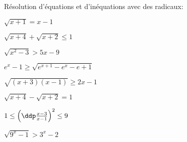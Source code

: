 
\begin{exercice}  \;
R\'esolution d'\'equations et d'in\'equations avec des radicaux:
\begin{enumerate}
\begin{minipage}[t]{0.45\textwidth}
\item $\sqrt{x+1}=x-1$
\item $\sqrt{x+4}+\sqrt{x+2}\leq 1$
\item $\sqrt{x^2-3}>5x-9$
\item $e^x-1\geq \sqrt{e^{x+1}-e^x-e+1}$
\item $\sqrt{(x+3)(x-1)}\geq 2x-1$
\end{minipage}
\begin{minipage}[t]{0.45\textwidth}
\item $\sqrt{x+4}-\sqrt{x+2}=1$
\item $1\leq \left(\ddp\frac{x-3}{x-1}   \right)^2\leq 9$
\item $\sqrt{9^x-1}>3^x-2$
\end{minipage}
\end{enumerate}
\end{exercice}
